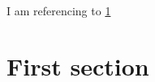 \documentclass[a4paper,10pt]{article}
\begin{document}
I am referencing to \cref{target}

\section{First section}
\label{target}
\end{document}
